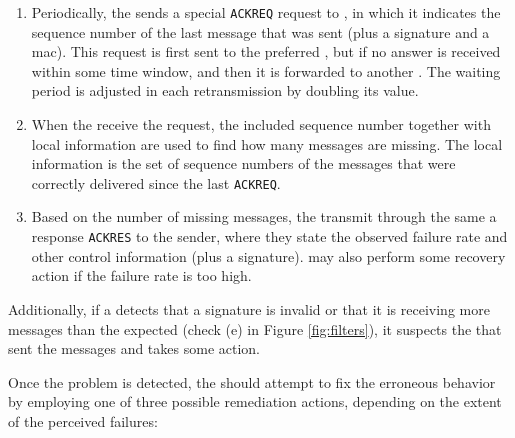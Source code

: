 \begin{enumerate}

\item Periodically, the \sender sends a special \texttt{ACKREQ} request to \repsieves, in which it indicates the sequence number of the last message that was sent (plus a signature and a \gls{mac}).
This request is first sent to the preferred \presieve, but if no answer is received within some time window, and then it is forwarded to another \presieve.
The waiting period is adjusted in each retransmission by doubling its value.

\item When the \repsieves receive the request, the included sequence number together with local information are used to find how many messages are missing. 
The local information is the set of sequence numbers of the messages that were correctly delivered since the last \texttt{ACKREQ}.

\item Based on the number of missing messages, the \repsieves transmit through the same \presieve a response \texttt{ACKRES} to the sender, where they state the observed failure rate and other control information (plus a signature).
\Repsieves may also perform some recovery action if the failure rate is too high.

\end{enumerate}

Additionally, if a \repsieve detects that a signature is invalid or that it is receiving more messages than the expected (check (e) in Figure \ref{fig:filters}), it suspects the \presieve that sent the messages and takes some action.


Once the problem is detected, the \repsieves should attempt to fix the erroneous behavior by employing one of three possible remediation actions, depending on the extent of the perceived failures:

